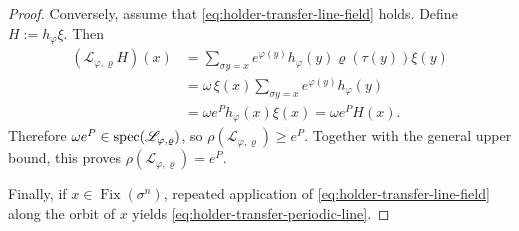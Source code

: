 \begin{proof}
  Conversely, assume that \eqref{eq:holder-transfer-line-field} holds.
  Define \(H:=h_\varphi\xi\). Then
  \begin{align*}
    (\mathscr L_{\varphi,\varrho}H)(x)
    &=
    \sum_{\sigma y=x}
      e^{\varphi(y)}h_\varphi(y)\varrho(\tau(y))\xi(y) \\
    &=
    \omega\,\xi(x)\sum_{\sigma y=x}e^{\varphi(y)}h_\varphi(y) \\
    &=
    \omega e^P h_\varphi(x)\xi(x)
    =\omega e^P H(x).
  \end{align*}
  Therefore \(\omega e^P\in\operatorname{spec}(\mathscr L_{\varphi,\varrho})\), so
  \(\rho(\mathscr L_{\varphi,\varrho})\ge e^P\). Together with the
  general upper bound, this proves
  \(\rho(\mathscr L_{\varphi,\varrho})=e^P\).

  Finally, if \(x\in\operatorname{Fix}(\sigma^n)\), repeated application
  of \eqref{eq:holder-transfer-line-field} along the orbit of \(x\)
  yields \eqref{eq:holder-transfer-periodic-line}.
\end{proof}
